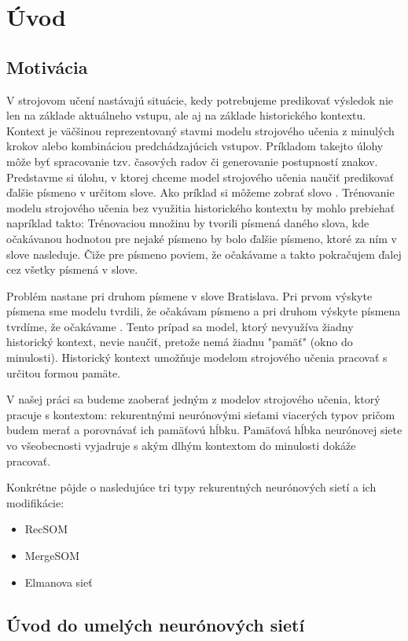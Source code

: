 \chapter{Úvod}

\section{Motivácia}
V strojovom učení nastávajú situácie, kedy potrebujeme predikovať výsledok nie len na 
základe aktuálneho vstupu, ale aj na základe historického kontextu. 
Kontext je väčšinou reprezentovaný stavmi modelu strojového učenia z minulých krokov alebo kombináciou predchádzajúcich vstupov.
Príkladom takejto úlohy môže byť spracovanie tzv. časových radov či generovanie postupností znakov.
Predstavme si úlohu, v ktorej chceme model strojového učenia naučiť predikovať ďalšie písmeno v určitom slove. 
Ako príklad si môžeme zobrať slovo . 
Trénovanie modelu strojového učenia bez využitia historického kontextu by mohlo prebiehať napríklad takto:
Trénovaciou množinu by tvorili písmená daného slova, kde očakávanou hodnotou pre nejaké písmeno by bolo ďalšie písmeno, ktoré za ním v slove nasleduje.
Čiže pre písmeno  poviem, že očakávame  a takto pokračujem ďalej cez všetky písmená v slove.

Problém nastane pri druhom písmene  v slove Bratislava. Pri prvom výskyte písmena  sme modelu tvrdili, že očakávam písmeno  a 
pri druhom výskyte písmena  tvrdíme, že očakávame . 
Tento prípad sa model, ktorý nevyužíva žiadny historický kontext, nevie naučiť, pretože nemá žiadnu "pamäť" (okno do minulosti). 
Historický kontext umožňuje modelom strojového učenia pracovať s určitou formou pamäte.

V našej práci sa budeme zaoberať jedným z modelov strojového učenia, 
ktorý pracuje s kontextom: rekurentnými neurónovými sieťami viacerých typov pričom
budem merať a porovnávať ich pamäťovú hĺbku. 
Pamäťová hĺbka neurónovej siete vo všeobecnosti vyjadruje s akým dlhým kontextom do minulosti dokáže pracovať.

Konkrétne pôjde o nasledujúce tri typy rekurentných neurónových sietí a ich modifikácie:
\begin{itemize}
	\item RecSOM
	\item MergeSOM
	\item Elmanova sieť
\end{itemize}

\section{Úvod do umelých neurónových sietí}

